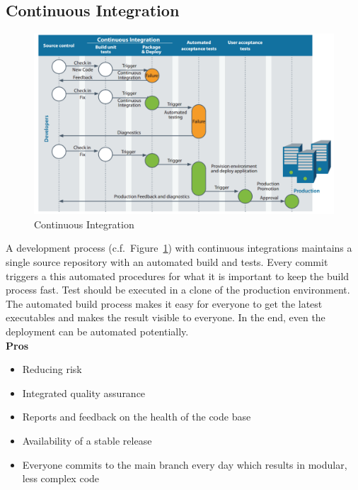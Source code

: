 \subsection{Continuous Integration}
\begin{figure}[h]
  \centering
  \includegraphics[width=.8\textwidth]{images/continuous_integration.png}
  \caption{Continuous Integration}\label{fig:continuous_integration}
\end{figure}
A development process (c.f.\ Figure~\ref{fig:continuous_integration}) with continuous integrations maintains a single source repository with an automated build and tests.
Every commit triggers a this automated procedures for what it is important to keep the build process fast.
Test should be executed in a clone of the production environment.
The automated build process makes it easy for everyone to get the latest executables and makes the result visible to everyone.
In the end, even the deployment can be automated potentially.\\

\textbf{Pros}
\begin{itemize}
  \item Reducing risk
  \item Integrated quality assurance
  \item Reports and feedback on the health of the code base
  \item Availability of a stable release
  \item Everyone commits to the main branch every day which results in modular, less complex code
\end{itemize}

